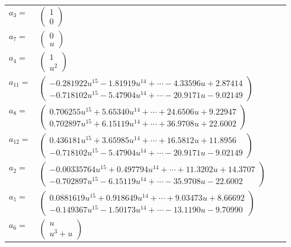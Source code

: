\documentclass[1p]{elsarticle_modified}
\theoremstyle{definition}
\begin{document}
\begin{tabular}{m{7pt} m{180pt} m{7pt} m{180pt} }
\flushright $a_{3}=$&$\begin{pmatrix}1\\0\end{pmatrix}$ \\
\flushright $a_{7}=$&$\begin{pmatrix}0\\u\end{pmatrix}$ \\
\flushright $a_{4}=$&$\begin{pmatrix}1\\u^2\end{pmatrix}$ \\
\flushright $a_{11}=$&$\begin{pmatrix}-0.281922 u^{15}-1.81919 u^{14}+\cdots-4.33596 u+2.87414\\-0.718102 u^{15}-5.47904 u^{14}+\cdots-20.9171 u-9.02149\end{pmatrix}$ \\
\flushright $a_{8}=$&$\begin{pmatrix}0.706255 u^{15}+5.65340 u^{14}+\cdots+24.6506 u+9.22947\\0.702897 u^{15}+6.15119 u^{14}+\cdots+36.9708 u+22.6002\end{pmatrix}$ \\
\flushright $a_{12}=$&$\begin{pmatrix}0.436181 u^{15}+3.65985 u^{14}+\cdots+16.5812 u+11.8956\\-0.718102 u^{15}-5.47904 u^{14}+\cdots-20.9171 u-9.02149\end{pmatrix}$ \\
\flushright $a_{2}=$&$\begin{pmatrix}-0.00335764 u^{15}+0.497794 u^{14}+\cdots+11.3202 u+14.3707\\-0.702897 u^{15}-6.15119 u^{14}+\cdots-35.9708 u-22.6002\end{pmatrix}$ \\
\flushright $a_{1}=$&$\begin{pmatrix}0.0881619 u^{15}+0.918649 u^{14}+\cdots+9.03473 u+8.66692\\-0.149367 u^{15}-1.50173 u^{14}+\cdots-13.1190 u-9.70990\end{pmatrix}$ \\
\flushright $a_{6}=$&$\begin{pmatrix}u\\u^3+u\end{pmatrix}$ \\

\end{tabular}
\end{document}
